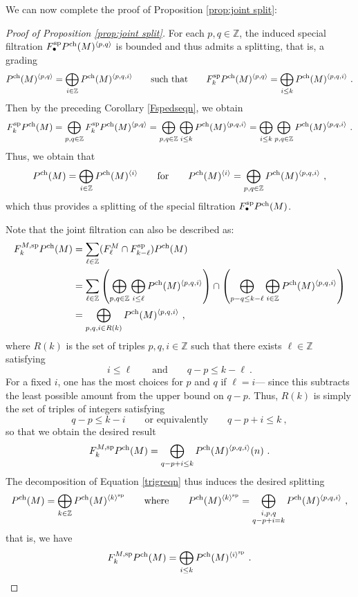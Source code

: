 \documentclass[11pt]{amsart}
\numberwithin{equation}{section}
\theoremstyle{definition}
\newcommand{\bb}{\mathbb}
\newcommand{\spe}{{\textup{sp}}}
\newcommand{\ch}{{\textup{ch}}}
\newcommand{\0}{{\textbf{0}}}
\newcommand{\Z}{\bb Z}
\def\ch{{\rm ch}}
\begin{document}
We can now complete the proof of Proposition \ref{prop:joint split}:
\begin{proof}[Proof of Proposition \ref{prop:joint split}] 

For each $p,q \in \Z$, the induced special filtration $F_\bullet^\spe P^\ch(M)^{\langle p,q \rangle}$ is bounded and thus admits a splitting, that is, a grading
	\[
	P^\ch(M)^{\langle p,q \rangle} = \bigoplus_{i \in \Z} P^\ch(M)^{\langle p,q,i \rangle} \qquad \text{such that} \qquad F_k^\spe P^\ch(M)^{\langle p,q \rangle} = \bigoplus_{i \leq k} P^\ch(M)^{\langle p,q,i \rangle} \ .  
	\]
	Then by the preceding Corollary \ref{Fspedseqn}, we obtain
	\[
	F_k^\spe P^\ch(M) = \bigoplus_{p,q \in \Z} F_k^\spe P^\ch(M)^{\langle p,q\rangle}  = \bigoplus_{p,q \in \Z}\bigoplus_{i \leq k} P^\ch(M)^{\langle p,q,i \rangle} = \bigoplus_{i \leq k}\bigoplus_{p,q \in \Z} P^\ch(M)^{\langle p,q,i \rangle} \ . 
	\]
	Thus, we obtain that
\begin{equation}\label{trigreqn}
		 P^\ch(M) = \bigoplus_{i \in \Z}P^\ch(M)^{\langle i \rangle }    \qquad \text{for}\qquad P^\ch(M)^{\langle i \rangle} =\bigoplus_{p,q \in \Z} P^\ch(M)^{\langle p,q,i \rangle} \ ,
\end{equation}
	which thus provides a splitting of the special filtration $F_\bullet^\spe P^\ch(M)$.
	
Note that the joint filtration can also be described as:
\begin{align*}
		 F_k^{M,\spe} P^\ch(M) & = \sum_{\ell \in \Z} (F_{\ell}^{M}\cap F_{k-\ell}^\spe) P^\ch(M) \\
		 & = \sum_{\ell \in \Z} \left(\bigoplus_{p,q \in \Z}\bigoplus_{i \leq \ell} P^\ch(M)^{\langle p,q,i \rangle}   \right) \cap \left( \bigoplus_{p-q\leq k-\ell}\bigoplus_{i\in \Z} P^\ch(M)^{\langle p,q,i \rangle} \right) \\
		 & = \bigoplus_{p,q,i \in R(k)} P^\ch(M)^{\langle p,q,i \rangle} \ ,
\end{align*}
where $R(k)$ is the set of triples $p,q,i \in \Z$ such that there exists $\ell \in \Z$ satisfying
\[ 
i \leq \ell \qquad \text{and} \qquad  q-p\leq k-\ell  \ .
\]
For a fixed $i$, one has the most choices for $p$ and $q$ if $\ell=i$--- since this subtracts the least possible amount from the upper bound on $q-p$. Thus, $R(k)$ is simply the set of triples of integers satisfying
\[ q-p \leq k- i \qquad \text{or equivalently} \qquad q-p+i\leq k \ , \]
so that we obtain the desired result
\[ 
F_k^{M,\spe} P^\ch(M) = \bigoplus_{q-p+i\leq k} P^\ch(M)^{\langle p,q,i \rangle}(n) \ .   
\]
The decomposition of Equation \ref{trigreqn} thus induces the desired splitting
\begin{equation}\label{eq:splitting joint filtration}
P^\ch(M) = \bigoplus_{k\in \Z}P^\ch(M)^{\langle k \rangle^\spe}  \qquad \text{where} \qquad P^\ch(M)^{\langle k \rangle^\spe}=\bigoplus_{\substack{i,p,q \\ q-p+i=k}} P^\ch(M)^{\langle p,q,i \rangle} \ ,
\end{equation}
that is, we have
\[  
F_k^{M,\spe} P^\ch(M) = \bigoplus_{i \leq k}P^\ch(M)^{\langle i \rangle^\spe} 
\ . 
\]

\end{proof}
\end{document}
